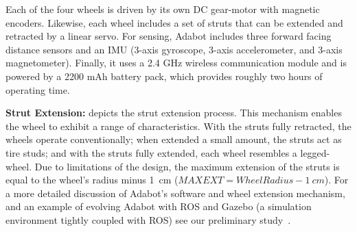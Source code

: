 \vspace{-0.1in}

Each of the four wheels is driven by its own DC gear-motor with magnetic encoders.
%
Likewise, each wheel includes a set of struts that can be extended and retracted by a linear servo.
%
For sensing, Adabot includes three forward facing distance sensors and an IMU (3-axis gyroscope, 3-axis accelerometer, and 3-axis magnetometer).
%
Finally, it uses a 2.4 GHz wireless communication module and is powered by a 2200 mAh battery pack, which provides roughly two hours of operating time.


\vspace{0.1in}
\noindent
\textbf{Strut Extension:}
%
 depicts the strut extension process.
%
This mechanism enables the wheel to exhibit a range of characteristics.
%
With the struts fully retracted, the wheels operate conventionally; when extended a small amount, the struts act as tire studs; and with the struts fully extended, each wheel resembles a legged-wheel.
%
%
Due to limitations of the design, the maximum extension of the struts is equal to the wheel's radius minus 1~\si{cm} ($\mathit{MAXEXT} = \mathit{WheelRadius} - 1~\si{cm}$).
%
For a more detailed discussion of Adabot's software and wheel extension mechanism, and an example of evolving Adabot with ROS and Gazebo (a simulation environment tightly coupled with ROS)
see our preliminary study~\citep{Clark.2017.SSCI.Adabot}.



